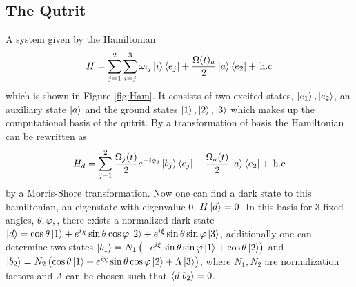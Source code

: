 \subsection{The Qutrit}
A system given by the Hamiltonian
\begin{equation}
\label{eq:Ham}
H = \sum_{j = 1}^2 \sum_{i =j}^{3} \omega_{ij}\ket{i}\bra{e_j}  + \frac{\Omega(t)_{a}}{2}\ket{a}\bra{e_2}  +\,\text{h.c}
\end{equation}
which is shown in Figure \ref{fig:Ham}.  It consists of two excited states, $\ket{e_1}, \ket{e_2}$, an auxiliary state $\ket{a}$ and the ground states $\ket{1}, \ket{2}, \ket{3}$ which 
makes up the computational basis of the qutrit. By a transformation of basis the Hamiltonian can be rewritten as 
\begin{equation}
\label{eq:Hamd}
H_d = \sum_{j = 1}^2 \frac{\Omega_j(t)}{2}e^{-i\phi_j}\ket{b_j}\bra{e_j}  + \frac{\Omega_a(t)}{2}\ket{a}\bra{e_2}  +\,\text{h.c}
\end{equation} 
by a Morris-Shore transformation\cite{morris}. Now one can find a dark state to this hamiltonian, an eigenstate with eigenvalue $0$, $H\ket{d} = 0$. In this basis for 3 fixed angles, $\theta, \varphi, $, there exists a normalized dark state $\ket{d} = \cos\theta\ket{1} + e^{i\chi}\sin\theta\cos\varphi\ket{2} + e^{i\xi}\sin\theta\sin\varphi\ket{3}$, additionally one can determine two states $\ket{b_1} = N_1 \left(-e^{i\xi}\sin\theta\sin\varphi\ket{1} + \cos\theta\ket{2} \right)$ and $\ket{b_2} = N_2 \left(\cos\theta\ket{1} +  e^{i\chi}\sin\theta\cos\varphi\ket{2} + \Lambda \ket{3}\right ) $, where $N_1, N_2$ are normalization factors and $\Lambda$ can be chosen such that $\bra{d}\ket{b_2} = 0$.


